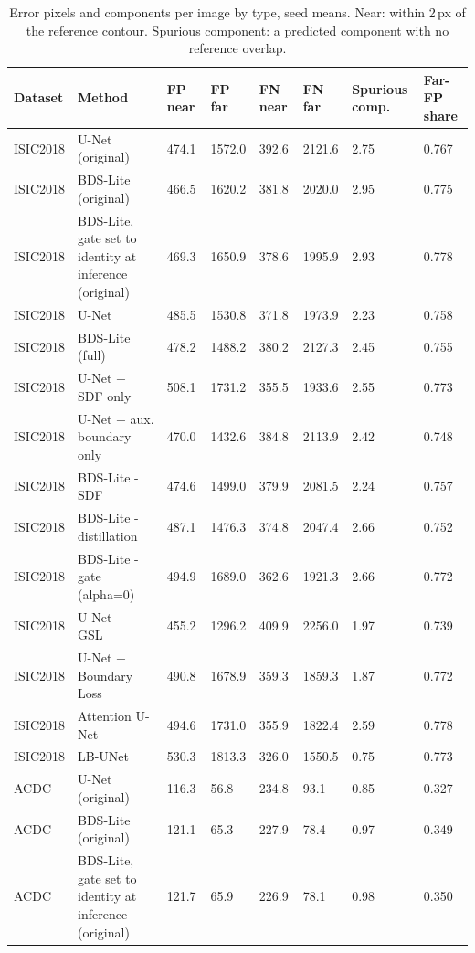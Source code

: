 \begin{longtable}{llllllll}
\caption{\label{tab:errorbands}Error pixels and components per image by type, seed means. Near: within 2\,px of the reference contour. Spurious component: a predicted component with no reference overlap.}\\
\toprule
Dataset & Method & FP near & FP far & FN near & FN far & Spurious comp. & Far-FP share \\
\midrule
ISIC2018 & U-Net (original) & 474.1 & 1572.0 & 392.6 & 2121.6 & 2.75 & 0.767 \\
ISIC2018 & BDS-Lite (original) & 466.5 & 1620.2 & 381.8 & 2020.0 & 2.95 & 0.775 \\
ISIC2018 & BDS-Lite, gate set to identity at inference (original) & 469.3 & 1650.9 & 378.6 & 1995.9 & 2.93 & 0.778 \\
ISIC2018 & U-Net & 485.5 & 1530.8 & 371.8 & 1973.9 & 2.23 & 0.758 \\
ISIC2018 & BDS-Lite (full) & 478.2 & 1488.2 & 380.2 & 2127.3 & 2.45 & 0.755 \\
ISIC2018 & U-Net + SDF only & 508.1 & 1731.2 & 355.5 & 1933.6 & 2.55 & 0.773 \\
ISIC2018 & U-Net + aux. boundary only & 470.0 & 1432.6 & 384.8 & 2113.9 & 2.42 & 0.748 \\
ISIC2018 & BDS-Lite - SDF & 474.6 & 1499.0 & 379.9 & 2081.5 & 2.24 & 0.757 \\
ISIC2018 & BDS-Lite - distillation & 487.1 & 1476.3 & 374.8 & 2047.4 & 2.66 & 0.752 \\
ISIC2018 & BDS-Lite - gate (alpha=0) & 494.9 & 1689.0 & 362.6 & 1921.3 & 2.66 & 0.772 \\
ISIC2018 & U-Net + GSL & 455.2 & 1296.2 & 409.9 & 2256.0 & 1.97 & 0.739 \\
ISIC2018 & U-Net + Boundary Loss & 490.8 & 1678.9 & 359.3 & 1859.3 & 1.87 & 0.772 \\
ISIC2018 & Attention U-Net & 494.6 & 1731.0 & 355.9 & 1822.4 & 2.59 & 0.778 \\
ISIC2018 & LB-UNet & 530.3 & 1813.3 & 326.0 & 1550.5 & 0.75 & 0.773 \\
ACDC & U-Net (original) & 116.3 & 56.8 & 234.8 & 93.1 & 0.85 & 0.327 \\
ACDC & BDS-Lite (original) & 121.1 & 65.3 & 227.9 & 78.4 & 0.97 & 0.349 \\
ACDC & BDS-Lite, gate set to identity at inference (original) & 121.7 & 65.9 & 226.9 & 78.1 & 0.98 & 0.350 \\

\end{longtable}
